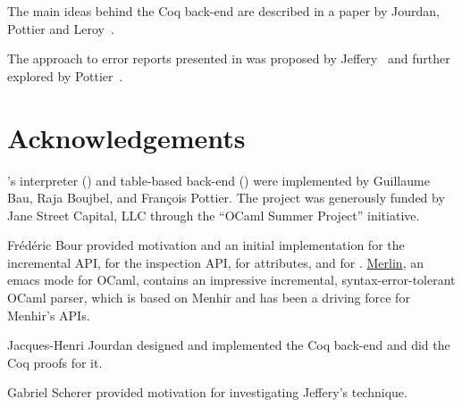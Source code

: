 \documentclass[onecolumn,11pt,nocopyrightspace,preprint]{sigplanconf}
\begin{document}
The main ideas behind the Coq back-end are described in a paper by Jourdan,
Pottier and Leroy~\cite{jourdan-leroy-pottier-12}.

The approach to error reports presented in  was
proposed by Jeffery~\citeyear{jeffery-03} and further explored by
Pottier~\citeyear{pottier-reachability-cc-2016}.


\section{Acknowledgements}

\menhir's interpreter (\ointerpret) and table-based back-end (\otable) were
implemented by Guillaume Bau, Raja Boujbel, and François Pottier. The project
was generously funded by Jane Street Capital, LLC through the ``OCaml Summer
Project'' initiative.

Frédéric Bour provided motivation and an initial implementation for the
incremental API, for the inspection API, for attributes, and for \menhirsdk.
\href{https://github.com/ocaml/merlin}{Merlin}, an emacs mode for OCaml,
contains an impressive incremental, syntax-error-tolerant OCaml parser,
which is based on Menhir and has been a driving force for Menhir's APIs.

Jacques-Henri Jourdan designed and implemented the Coq back-end and did the
Coq proofs for it.

Gabriel Scherer provided motivation for investigating Jeffery's technique.





\end{document}
